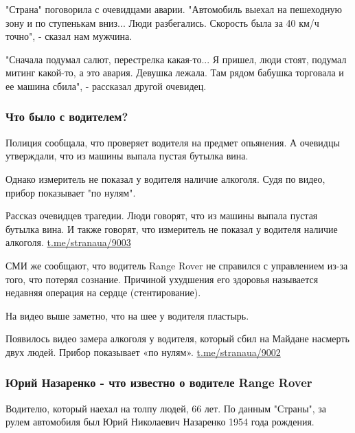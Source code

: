 "Страна" поговорила с очевидцами аварии. "Автомобиль выехал на пешеходную зону
и по ступенькам вниз... Люди разбегались. Скорость была за 40 км/ч точно", -
сказал нам мужчина.

"Сначала подумал салют, перестрелка какая-то... Я пришел, люди стоят, подумал
митинг какой-то, а это авария. Девушка лежала. Там рядом бабушка торговала и ее
машина сбила", - рассказал другой очевидец.

\subsubsection{Что было с водителем?}

Полиция сообщала, что проверяет водителя на предмет опьянения. А очевидцы
утверждали, что из машины выпала пустая бутылка вина. 

Однако измеритель не показал у водителя наличие алкоголя. Судя по видео, прибор
показывает "по нулям".

\begin{center}
  \begin{fminipage}{0.7\textwidth}
Рассказ очевидцев трагедии. Люди говорят, что из машины выпала пустая бутылка
вина. И также говорят, что измеритель не показал у водителя наличие
алкоголя.
\url{t.me/stranaua/9003}
  \end{fminipage}
\end{center}

СМИ же сообщают, что водитель Range Rover не справился с управлением из-за
того, что потерял сознание. Причиной ухудшения его здоровья называется недавняя
операция на сердце (стентирование). 

На видео выше заметно, что на шее у водителя пластырь. 

\begin{center}
  \begin{fminipage}{0.7\textwidth}
Появилось видео замера алкоголя у водителя, который сбил на Майдане насмерть
двух людей. Прибор показывает «по нулям».
\url{t.me/stranaua/9002}
  \end{fminipage}
\end{center}

\subsubsection{Юрий Назаренко - что известно о водителе Range Rover}

Водителю, который наехал на толпу людей, 66 лет. По данным "Страны", за рулем
автомобиля был Юрий Николаевич Назаренко 1954 года рождения.

